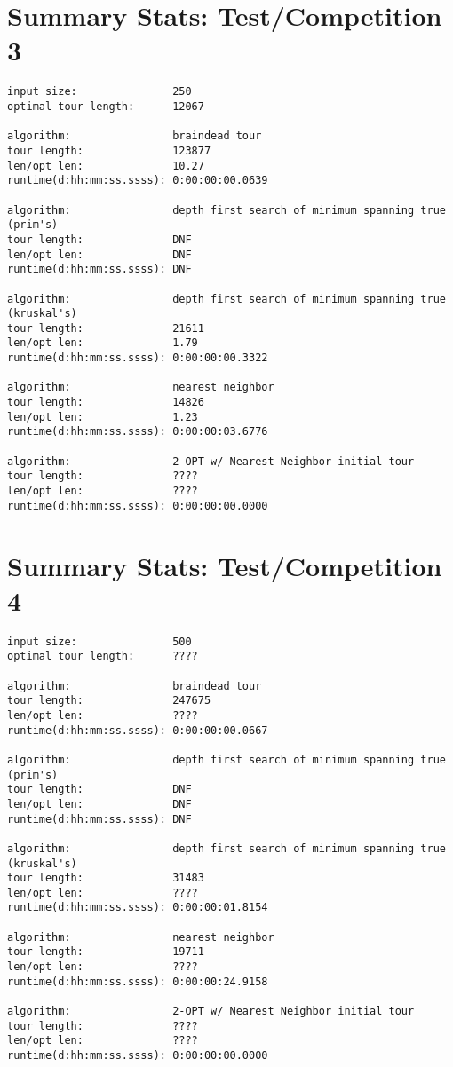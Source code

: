 \documentclass[12pt]{article}
\begin{document}
\newpage
\section*{Summary Stats: Test/Competition 3}
\begin{verbatim}
input size:               250
optimal tour length:      12067

algorithm:                braindead tour
tour length:              123877
len/opt len:              10.27
runtime(d:hh:mm:ss.ssss): 0:00:00:00.0639

algorithm:                depth first search of minimum spanning true (prim's) 
tour length:              DNF
len/opt len:              DNF
runtime(d:hh:mm:ss.ssss): DNF

algorithm:                depth first search of minimum spanning true (kruskal's) 
tour length:              21611
len/opt len:              1.79
runtime(d:hh:mm:ss.ssss): 0:00:00:00.3322

algorithm:                nearest neighbor 
tour length:              14826
len/opt len:              1.23
runtime(d:hh:mm:ss.ssss): 0:00:00:03.6776

algorithm:                2-OPT w/ Nearest Neighbor initial tour
tour length:              ????
len/opt len:              ????
runtime(d:hh:mm:ss.ssss): 0:00:00:00.0000
\end{verbatim}

\newpage
\section*{Summary Stats: Test/Competition 4}
\begin{verbatim}
input size:               500
optimal tour length:      ????

algorithm:                braindead tour
tour length:              247675
len/opt len:              ????
runtime(d:hh:mm:ss.ssss): 0:00:00:00.0667

algorithm:                depth first search of minimum spanning true (prim's) 
tour length:              DNF
len/opt len:              DNF
runtime(d:hh:mm:ss.ssss): DNF

algorithm:                depth first search of minimum spanning true (kruskal's) 
tour length:              31483
len/opt len:              ????
runtime(d:hh:mm:ss.ssss): 0:00:00:01.8154

algorithm:                nearest neighbor 
tour length:              19711
len/opt len:              ????
runtime(d:hh:mm:ss.ssss): 0:00:00:24.9158

algorithm:                2-OPT w/ Nearest Neighbor initial tour
tour length:              ????
len/opt len:              ????
runtime(d:hh:mm:ss.ssss): 0:00:00:00.0000
\end{verbatim}
\end{document}
